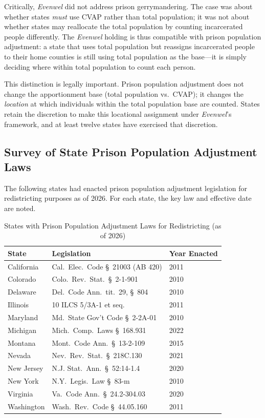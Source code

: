 Critically, \textit{Evenwel} did not address prison gerrymandering.
The case was about whether states \textit{must} use CVAP rather than total
population; it was not about whether states may reallocate the total
population by counting incarcerated people differently. The \textit{Evenwel}
holding is thus compatible with prison population adjustment: a state that
uses total population but reassigns incarcerated people to their home
counties is still using total population as the base---it is simply
deciding where within total population to count each person.

This distinction is legally important. Prison population adjustment
does not change the apportionment base (total population vs.\ CVAP);
it changes the \textit{location} at which individuals within the total
population base are counted. States retain the discretion to make
this locational assignment under \textit{Evenwel}'s framework,
and at least twelve states have exercised that discretion.

\subsection{Survey of State Prison Population Adjustment Laws}

The following states had enacted prison population adjustment legislation
for redistricting purposes as of 2026. For each state, the key law
and effective date are noted.

\begin{table}[ht]
\centering
\caption{States with Prison Population Adjustment Laws for Redistricting (as of 2026)}
\label{tab:state-laws}
\begin{tabular}{lll}
\toprule
State & Legislation & Year Enacted \\
\midrule
California & Cal.\ Elec.\ Code \S\ 21003 (AB 420) & 2011 \\
Colorado & Colo.\ Rev.\ Stat.\ \S\ 2-1-901 & 2010 \\
Delaware & Del.\ Code Ann.\ tit.\ 29, \S\ 804 & 2010 \\
Illinois & 10 ILCS 5/3A-1 et seq. & 2011 \\
Maryland & Md.\ State Gov't Code \S\ 2-2A-01 & 2010 \\
Michigan & Mich.\ Comp.\ Laws \S\ 168.931 & 2022 \\
Montana & Mont.\ Code Ann.\ \S\ 13-2-109 & 2015 \\
Nevada & Nev.\ Rev.\ Stat.\ \S\ 218C.130 & 2021 \\
New Jersey & N.J. Stat.\ Ann.\ \S\ 52:14-1.4 & 2020 \\
New York & N.Y.\ Legis.\ Law \S\ 83-m & 2010 \\
Virginia & Va.\ Code Ann.\ \S\ 24.2-304.03 & 2020 \\
Washington & Wash.\ Rev.\ Code \S\ 44.05.160 & 2011 \\
\bottomrule
\end{tabular}
\end{table}

